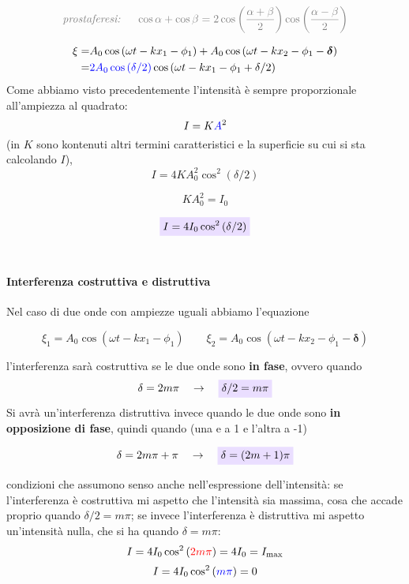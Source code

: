 \documentclass[x11names]{article}
\newcommand{\viola}[1]{\colorbox{myred}{$\displaystyle #1$}}
\begin{document}
		\[
		\textcolor{gray}{\textit{prostaferesi: } \quad \cos\alpha + \cos\beta = 2\cos\left(\frac{\alpha + \beta}{2}\right)\cos\left(\frac{\alpha - \beta}{2}\right)}
		\]
		
		\begin{align*}
			\xi =& A_0\cos\left(\omega t - kx_1 - \phi_1\right) + A_0\cos\left(\omega t - kx_2 - \phi_1 - \boldsymbol{\delta}\right)\\
				=& \textcolor{blue}{2A_0\cos\left(\delta/2\right)}\cos\left(\omega t - kx_1 - \phi_1+\delta/2\right)
		\end{align*}
		Come abbiamo visto precedentemente l'intensità è sempre proporzionale all'ampiezza al quadrato:
		\[ 
		I = K\textcolor{blue}{A}^2
		\]
		(in \(K\) sono kontenuti altri termini caratteristici e la superficie su cui si sta calcolando \(I\)),
		\[ 
		I = 4KA_0^2 \cos^2\left(\delta/2\right)
		\]
		
		\[ 
		\boxed{KA_0^2 = I_0}
		\]
		
		\begin{equation}
				\viola{I = 4I_0 \cos^2\left(\delta/2\right)}
		\end{equation} \\
		
		\begin{es}{}
			\paragraph{Interferenza costruttiva e distruttiva}
			Nel caso di due onde con ampiezze uguali abbiamo l'equazione 
			
			\[ 
			\xi_1 = A_0\cos\left(\omega t - kx_1 - \phi_1\right)
			\qquad
			\xi_2 = A_0\cos\left(\omega t - kx_2 - \phi_1 - \boldsymbol{\delta}\right)
			\] 
			
			l'interferenza sarà costruttiva se le due onde sono \textbf{in fase}, ovvero quando 
			\[ 
			\delta = 2m\pi \quad \to \quad \viola{\delta/2 = m\pi }
			\]
			Si avrà un'interferenza distruttiva invece quando le due onde sono \textbf{in opposizione di fase}, quindi quando (una e a 1 e l'altra a -1)
			
			\[ 
			\delta = 2m\pi + \pi \quad \to \quad \viola{\delta = (2m+1)\pi }
			\]
			
			condizioni che assumono senso anche nell'espressione dell'intensità: se l'interferenza è costruttiva mi aspetto che l'intensità sia massima, cosa che accade proprio quando  \(\delta/2 = m\pi \); se invece l'interferenza è distruttiva mi aspetto un'intensità nulla, che si ha quando \(\delta = m\pi \):
			\[ 
			I = 4I_0 \cos^2\left(\textcolor{red}{2m\pi }\right) = 4I_0 = I_\text{max}
			\]
			\[ 
			I = 4I_0 \cos^2\left(\textcolor{blue}{m\pi }\right) = 0 
			\]
		\end{es}
		
\end{document}
